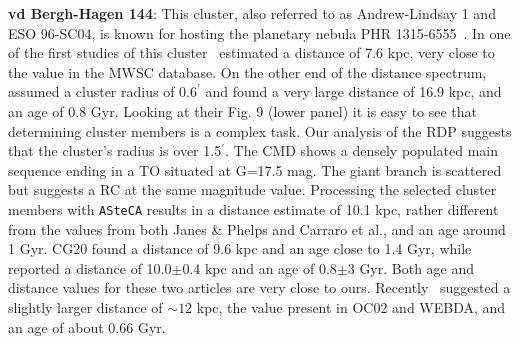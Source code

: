 \documentclass{aa}
\begin{document}
\begin{appendix}
  \noindent \textbf{vd Bergh-Hagen 144}: This cluster, also referred to as Andrew-Lindsay
  1 and ESO 96-SC04, is known for hosting the planetary nebula PHR
  1315-6555~\citep{Parker_2011}.
  In one of the first studies of this cluster~\cite{Janes_1994} estimated a
  distance of 7.6 kpc, very close to the value in the MWSC database. On the
  other end of the distance spectrum,
  \cite{Carraro_2005_neglected} assumed a cluster radius of $0.6^{\prime}$ and
  found a very large distance of 16.9 kpc, and an age of 0.8 Gyr. Looking at
  their Fig. 9 (lower panel) it is easy to see that determining cluster members
  is a complex task. Our analysis of the RDP suggests that the cluster's radius
  is over 1.5$^{\prime}$. The CMD shows a densely populated main sequence ending
  in a TO situated at G=17.5 mag. The giant branch is scattered but suggests a
  RC at the same magnitude value.
  Processing the selected cluster members with \texttt{ASteCA} results in a
  distance estimate of 10.1 kpc, rather different from the values
  from both Janes \& Phelps and Carraro et al., and an age around 1 Gyr.
  CG20 found a distance of 9.6 kpc and an age close to 1.4 Gyr,
  while~\cite{Majaess_2014} reported a distance of 10.0$\pm$0.4 kpc and an
  age of 0.8$\pm$3 Gyr. Both age and distance values for these two articles are
  very close to ours. Recently~\cite{Fragkou_2019} suggested a slightly larger
  distance of $\sim12$ kpc, the value present in OC02 and WEBDA, and an age of
  about 0.66 Gyr.\\


\end{appendix}
\end{document}
